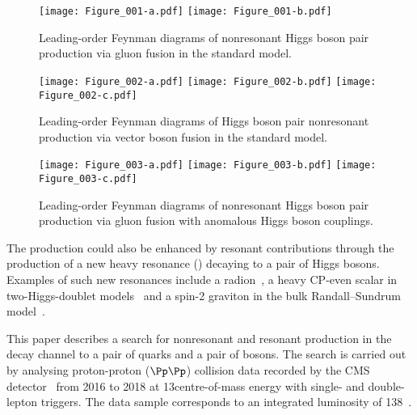 \begin{figure}[htb!]
  \centering
  \texttt{[image: Figure\_001-a.pdf]}
  \texttt{[image: Figure\_001-b.pdf]}
  \caption{Leading-order Feynman diagrams of nonresonant Higgs boson pair production via gluon fusion in the standard model.}
  \label{fig:dihiggs-production-diagrams-ggf_SM}
\end{figure}

\begin{figure}[htb!]
  \centering
  \texttt{[image: Figure\_002-a.pdf]}
  \texttt{[image: Figure\_002-b.pdf]}
  \texttt{[image: Figure\_002-c.pdf]}
  \caption{Leading-order Feynman diagrams of Higgs boson pair nonresonant production via vector boson fusion in the standard model.}
  \label{fig:dihiggs-production-diagrams-vbf}
\end{figure}

\begin{figure}[htb!]
  \centering
  \texttt{[image: Figure\_003-a.pdf]}
  \texttt{[image: Figure\_003-b.pdf]}
  \texttt{[image: Figure\_003-c.pdf]}
  \caption{Leading-order Feynman diagrams of nonresonant Higgs boson pair production via gluon fusion with anomalous Higgs boson couplings.}
  \label{fig:dihiggs-production-diagrams-ggf_BSM}
\end{figure}


The \HH production could also be enhanced by resonant contributions through the production of a new heavy resonance (\PX) decaying to a pair of Higgs bosons. Examples of such new resonances include a radion~\cite{Cheung:2000rw}, a heavy $\textrm{CP}$-even scalar in two-Higgs-doublet models~\cite{TwoHDM} and a spin-2 graviton in the bulk Randall--Sundrum model~\cite{Randall:1999ee, Goldberger:1999uk}.

This paper describes a search for nonresonant and resonant \HH production in the decay channel to a pair of \Pbottom quarks and a pair of \PW bosons. The search is carried out by analysing proton-proton ($\Pp\Pp$) collision data recorded by the CMS detector~\cite{Chatrchyan:2008zzk} from 2016 to 2018 at 13\TeV centre-of-mass energy with single- and double-lepton triggers. The data sample corresponds to an integrated luminosity of 138\fbinv~\cite{LUM-17-003,LUM-17-004,LUM-18-002}.

